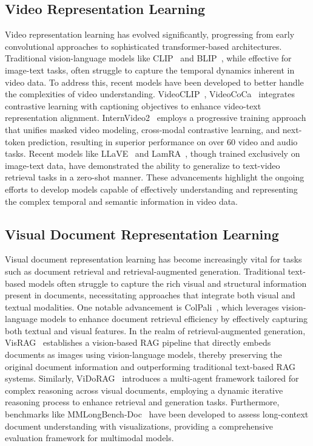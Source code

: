 \subsection{Video Representation Learning}
Video representation learning has evolved significantly, progressing from early convolutional approaches to sophisticated transformer-based architectures. Traditional vision-language models like CLIP~\citep{clip} and BLIP~\citep{blip}, while effective for image-text tasks, often struggle to capture the temporal dynamics inherent in video data. To address this, recent models have been developed to better handle the complexities of video understanding. VideoCLIP~\citep{videoclip}, VideoCoCa~\citep{videococa} integrates contrastive learning with captioning objectives to enhance video-text representation alignment. InternVideo2~\citep{internvideo2} employs a progressive training approach that unifies masked video modeling, cross-modal contrastive learning, and next-token prediction, resulting in superior performance on over 60 video and audio tasks. 
Recent models like LLaVE~\citep{llave} and  LamRA~\citep{lamra}, though trained exclusively on image-text data, have demonstrated the ability to generalize to text-video retrieval tasks in a zero-shot manner. These advancements highlight the ongoing efforts to develop models capable of effectively understanding and representing the complex temporal and semantic information in video data.



\subsection{Visual Document Representation Learning}

Visual document representation learning has become increasingly vital for tasks such as document retrieval and retrieval-augmented generation. Traditional text-based models often struggle to capture the rich visual and structural information present in documents, necessitating approaches that integrate both visual and textual modalities.
One notable advancement is ColPali~\citep{colpali}, which leverages vision-language models to enhance document retrieval efficiency by effectively capturing both textual and visual features. In the realm of retrieval-augmented generation, VisRAG~\citep{visrag} establishes a vision-based RAG pipeline that directly embeds documents as images using vision-language models, thereby preserving the original document information and outperforming traditional text-based RAG systems. Similarly, ViDoRAG~\citep{vidorag} introduces a multi-agent framework tailored for complex reasoning across visual documents, employing a dynamic iterative reasoning process to enhance retrieval and generation tasks. 
Furthermore, benchmarks like MMLongBench-Doc~\citep{mmlongbench} have been developed to assess long-context document understanding with visualizations, providing a comprehensive evaluation framework for multimodal models. 

